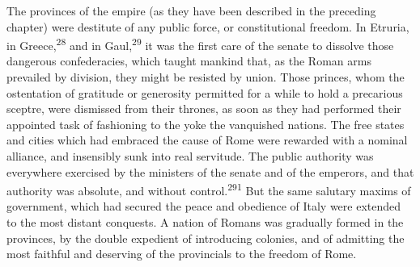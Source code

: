 The provinces of the empire (as they have been described in the
preceding chapter) were destitute of any public force, or
constitutional freedom. In Etruria, in Greece,\textsuperscript{28} and in Gaul,\textsuperscript{29}
it was the first care of the senate to dissolve those dangerous
confederacies, which taught mankind that, as the Roman arms
prevailed by division, they might be resisted by union. Those
princes, whom the ostentation of gratitude or generosity
permitted for a while to hold a precarious sceptre, were
dismissed from their thrones, as soon as they had performed their
appointed task of fashioning to the yoke the vanquished nations.
The free states and cities which had embraced the cause of Rome
were rewarded with a nominal alliance, and insensibly sunk into
real servitude. The public authority was everywhere exercised by
the ministers of the senate and of the emperors, and that
authority was absolute, and without control.\textsuperscript{291} But the same
salutary maxims of government, which had secured the peace and
obedience of Italy were extended to the most distant conquests. A
nation of Romans was gradually formed in the provinces, by the
double expedient of introducing colonies, and of admitting the
most faithful and deserving of the provincials to the freedom of
Rome.




